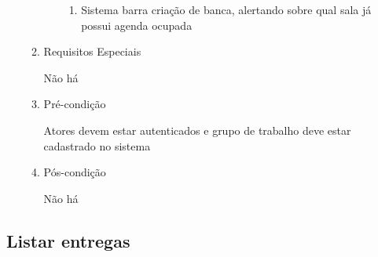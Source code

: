 \begin{enumerate}
\begin{enumerate}
\begin{enumerate}
\begin{enumerate}
    \item Sistema barra criação de banca, alertando sobre qual sala já possui agenda ocupada
\end{enumerate}
\end{enumerate}

 \item Requisitos Especiais


Não há


    \item Pré-condição


Atores devem estar autenticados e grupo de trabalho deve estar cadastrado no sistema


    \item Pós-condição

    Não há
\end{enumerate}
\end{enumerate}


\subsection{Listar entregas}


